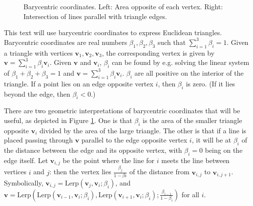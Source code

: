 \documentclass{amsart}[12pt]
\begin{document}
\begin{figure}%
\caption{Barycentric coordinates. Left: Area opposite of each vertex.
Right: Intersection of lines parallel with triangle edges.}
\label{fig:bary}
\end{figure}

This text will use barycentric coordinates to express Euclidean triangles.
Barycentric coordinates are real numbers $\beta_1, \beta_2, \beta_3$ such that
$\sum^3_{i=1} \beta_i = 1$. Given a triangle with vertices $\mathbf v_1,
\mathbf v_2, \mathbf v_3$, the corresponding vertex is given by $\mathbf v =
\sum^3_{i=1} \beta_i \mathbf v_i$. Given $\mathbf v$ and $\mathbf v_i$,
$\beta_i$ can be found by e.g. solving the linear system of
$\beta_1 + \beta_2 + \beta_3 = 1$ and $\mathbf v = \sum^3_{i=1} \beta_i \mathbf
v_i$. $\beta_i$ are all positive on the interior of the triangle. If a point
lies on an edge opposite vertex $i$, then $\beta_i$ is zero.
(If it lies beyond the edge, then $\beta_i < 0$.)

There are two geometric interpretations of barycentric coordinates that will be
useful, as depicted in Figure \ref{fig:bary}. One is that $\beta_i$ is the area
of the smaller triangle opposite $\mathbf v_i$ divided by the area of the large
triangle.
The other is that if a line is placed passing through $\mathbf v$ parallel to
the edge opposite vertex $i$, it will be at $\beta_i$ of the distance between
the edge and its opposite vertex, with $\beta_i = 0$ being on the edge itself.
Let $\mathbf v_{i,j}$ be the point where the line for $i$ meets the line between
vertices $i$ and $j$: then the vertex lies $\frac{\beta_{j}}{1-\beta{i}}$
of the distance from $\mathbf v_{i,j}$ to $\mathbf v_{i,j+1}$. Symbolically,
$\mathbf v_{i,j} = \mathrm{Lerp}(\mathbf v_{j},\mathbf v_i;\beta_{i})$, and
$\mathbf v = \mathrm{Lerp}(\mathrm{Lerp}(\mathbf v_{i-1}, \mathbf v_i;
\beta_{i}), \mathrm{Lerp}(\mathbf v_{i+1}, \mathbf v_i; \beta_{i});
\frac{\beta_{i-1}}{1-\beta_{i}})$ for all $i$.
\end{document}
